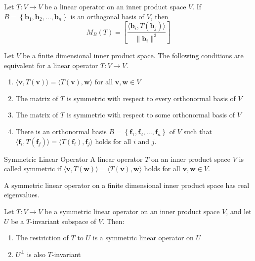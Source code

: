 \documentclass[12pt]{article}
\begin{document}
\begin{theorem}{}{}
    Let $ T : V \to V $ be a linear operator on an inner product space $ V $. If $ B = \left\{ \mathbf{b}_1, \mathbf{b}_2, \dots, \mathbf{b}_n \right\} $ is an orthogonal basis of $ V $, then
    \[ M_B \left( T \right) = \left[ \frac{\langle \mathbf{b}_i, T \left( \mathbf{b}_j \right) \rangle}{\lVert \mathbf{b}_i \rVert^2} \right] \]
\end{theorem}

\begin{theorem}{}{}
    Let $ V $ be a finite dimensional inner product space. The following conditions are equivalent for a linear operator $ T : V \to V $.
    \begin{enumerate}[label=(\roman*)]
        \item $ \langle \mathbf{v}, T \left( \mathbf{v} \right) \rangle = \langle T \left( \mathbf{v} \right), \mathbf{w} \rangle $ for all $ \mathbf{v}, \mathbf{w} \in V $
        \item The matrix of $ T $ is symmetric with respect to every orthonormal basis of $ V $
        \item The matrix of $ T $ is symmetric with respect to some orthonormal basis of $ V $
        \item There is an orthonormal basis $ B = \left\{ \mathbf{f}_1, \mathbf{f}_2, \dots, \mathbf{f}_n \right\} $ of $ V $ such that $ \langle \mathbf{f}_i, T \left( \mathbf{f}_j \right) \rangle = \langle T \left( \mathbf{f}_i \right), \mathbf{f}_j \rangle $ holds for all $ i $ and $ j $.
    \end{enumerate}
\end{theorem}

\begin{definition}{Symmetric Linear Operator}{}
    A linear operator $ T $ on an inner product space $ V $ is called symmetric if $ \langle \mathbf{v}, T \left( \mathbf{w} \right) \rangle = \langle T \left( \mathbf{v} \right), \mathbf{w} \rangle $ holds for all $ \mathbf{v}, \mathbf{w} \in V $.
\end{definition}

\begin{theorem}{}{}
    A symmetric linear operator on a finite dimensional inner product space has real eigenvalues.
\end{theorem}

\begin{theorem}{}{}
    Let $ T : V \to V $ be a symmetric linear operator on an inner product space $ V $, and let $ U $ be a $ T $-invariant subspace of $ V $. Then:
    \begin{enumerate}[label=(\roman*)]
        \item The restriction of $ T $ to $ U $ is a symmetric linear operator on $ U $
        \item $ U^\perp $ is also $ T $-invariant
    \end{enumerate}
\end{theorem}
\end{document}
